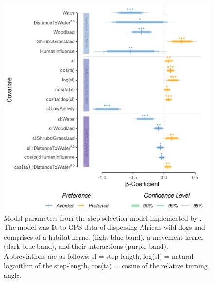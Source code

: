 \documentclass[abstract=on,10pt,a4paper,bibliography=totocnumbered]{article}
\begin{document}
\begin{figure}[htbp]
  \begin{center}
  \includegraphics[width = \textwidth]{99_MovementModel.png}
  \caption{Model parameters from the step-selection model implemented by
  \cite{Hofmann.2023}. The model was fit to GPS data of dispersing African wild
  dogs and comprises of a habitat kernel (light blue band), a movement kernel
  (dark blue band), and their interactions (purple band). Abbreviations are as
  follows: sl = step-length, log(sl) = natural logarithm of the step-length,
  cos(ta) = cosine of the relative turning angle.}
  \label{Model}
  \end{center}
\end{figure}

\newpage
\end{document}
